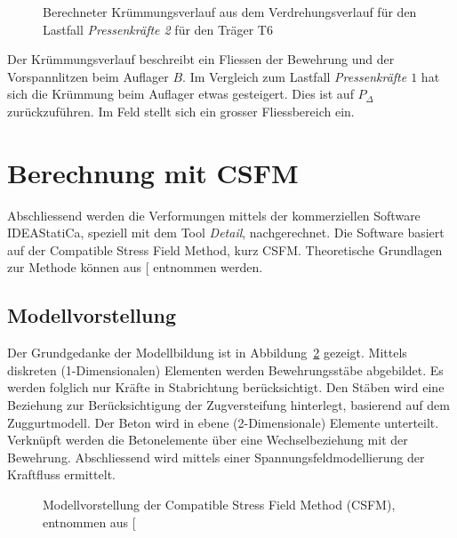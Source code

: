 \documentclass[
  11pt,
  letterpaper,
]{scrreprt}
\begin{document}
\begin{figure}[H]


\caption{\label{fig-chi-max-t6l12}Berechneter Krümmungsverlauf aus dem
Verdrehungsverlauf für den Lastfall \emph{Pressenkräfte 2} für den
Träger T6}

\end{figure}%

Der Krümmungsverlauf beschreibt ein Fliessen der Bewehrung und der
Vorspannlitzen beim Auflager \(B\). Im Vergleich zum Lastfall
\emph{Pressenkräfte \(1\)} hat sich die Krümmung beim Auflager etwas
gesteigert. Dies ist auf \(P_\Delta\) zurückzuführen. Im Feld stellt
sich ein grosser Fliessbereich ein.

\section{Berechnung mit CSFM}\label{berechnung-mit-csfm}

Abschliessend werden die Verformungen mittels der kommerziellen Software
IDEAStatiCa, speziell mit dem Tool \emph{Detail}, nachgerechnet. Die
Software basiert auf der Compatible Stress Field Method, kurz CSFM.
Theoretische Grundlagen zur Methode können aus
{[}\citeproc{ref-kaufmann_compatible_2020}{7}{]} entnommen werden.

\subsection{Modellvorstellung}\label{modellvorstellung-1}

Der Grundgedanke der Modellbildung ist in Abbildung~\ref{fig-csfm_base}
gezeigt. Mittels diskreten (1-Dimensionalen) Elementen werden
Bewehrungsstäbe abgebildet. Es werden folglich nur Kräfte in
Stabrichtung berücksichtigt. Den Stäben wird eine Beziehung zur
Berücksichtigung der Zugversteifung hinterlegt, basierend auf dem
Zuggurtmodell. Der Beton wird in ebene (2-Dimensionale) Elemente
unterteilt. Verknüpft werden die Betonelemente über eine
Wechselbeziehung mit der Bewehrung. Abschliessend wird mittels einer
Spannungsfeldmodellierung der Kraftfluss ermittelt.

\begin{figure}[H]


\caption{\label{fig-csfm_base}Modellvorstellung der Compatible Stress
Field Method (CSFM), entnommen aus
{[}\citeproc{ref-kaufmann_compatible_2020}{7}{]}}

\end{figure}%
\end{document}
